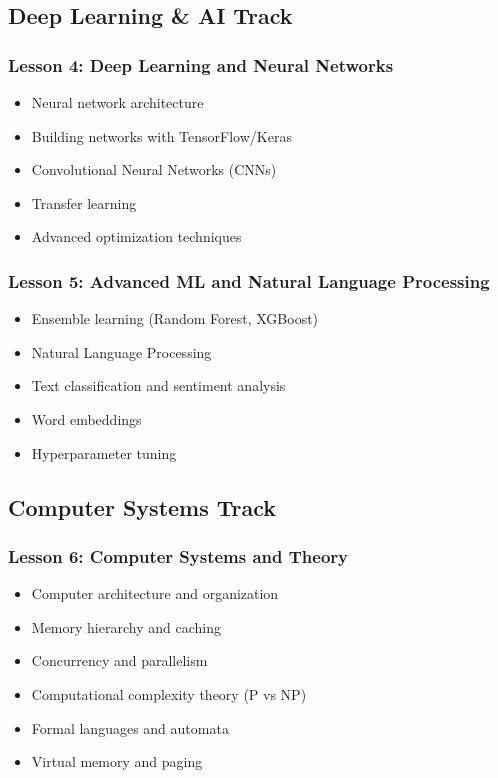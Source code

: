 \documentclass[11pt,letterpaper]{article}
\begin{document}
\subsection{Deep Learning \& AI Track}

\subsubsection{Lesson 4: Deep Learning and Neural Networks}
\begin{itemize}[leftmargin=*]
    \item Neural network architecture
    \item Building networks with TensorFlow/Keras
    \item Convolutional Neural Networks (CNNs)
    \item Transfer learning
    \item Advanced optimization techniques
\end{itemize}

\subsubsection{Lesson 5: Advanced ML and Natural Language Processing}
\begin{itemize}[leftmargin=*]
    \item Ensemble learning (Random Forest, XGBoost)
    \item Natural Language Processing
    \item Text classification and sentiment analysis
    \item Word embeddings
    \item Hyperparameter tuning
\end{itemize}

\subsection{Computer Systems Track}

\subsubsection{Lesson 6: Computer Systems and Theory}
\begin{itemize}[leftmargin=*]
    \item Computer architecture and organization
    \item Memory hierarchy and caching
    \item Concurrency and parallelism
    \item Computational complexity theory (P vs NP)
    \item Formal languages and automata
    \item Virtual memory and paging
\end{itemize}
\end{document}
